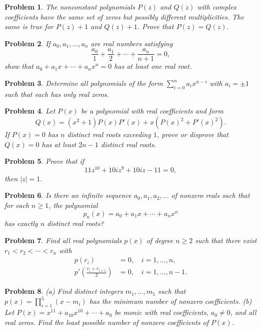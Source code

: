 \documentclass[12pt]{article}
\newtheorem{problem}{Problem}
\begin{document}
\begin{problem}
The nonconstant polynomials $P(z)$ and $Q(z)$ with complex coefficients have the same set of zeros but possibly different multiplicities. The same is true for $P(z)+1$ and $Q(z)+1$. Prove that $P(z)=Q(z)$.
\end{problem}

\begin{problem}
If $a_0, a_1, \dots, a_n$ are real numbers satisfying
\[
\frac{a_0}{1} + \frac{a_1}{2} + \cdots + \frac{a_n}{n+1} = 0,
\]
show that $a_0 + a_1x + \cdots + a_nx^n = 0$ has at least one real root.
\end{problem}

\begin{problem}
Determine all polynomials of the form $\sum_{i=0}^n a_ix^{n-i}$ with $a_i = \pm 1$ such that each has only real zeros.
\end{problem}

\begin{problem}
Let $P(x)$ be a polynomial with real coefficients and form
\[
Q(x) = (x^2+1)P(x)P'(x) + x(P(x)^2 + P'(x)^2).
\]
If $P(x)=0$ has $n$ distinct real roots exceeding $1$, prove or disprove that $Q(x)=0$ has at least $2n-1$ distinct real roots.
\end{problem}

\begin{problem}
Prove that if
\[
11z^{10} + 10iz^9 + 10iz - 11 = 0,
\]
then $|z|=1$.
\end{problem}

\begin{problem}
Is there an infinite sequence $a_0,a_1,a_2,\dots$ of nonzero reals such that for each $n\geq 1$, the polynomial
\[
p_n(x) = a_0 + a_1x + \cdots + a_nx^n
\]
has exactly $n$ distinct real roots?
\end{problem}

\begin{problem}
Find all real polynomials $p(x)$ of degree $n\geq 2$ such that there exist $r_1<r_2<\cdots<r_n$ with
\begin{align*}
p(r_i)&=0, \quad i=1,\dots,n,\\
p'\!\left(\tfrac{r_i+r_{i+1}}{2}\right)&=0,\quad i=1,\dots,n-1.
\end{align*}
\end{problem}

\begin{problem}
(a) Find distinct integers $m_1,\dots,m_5$ such that $p(x)=\prod_{i=1}^5(x-m_i)$ has the minimum number of nonzero coefficients.  
(b) Let $P(x)=x^{11}+a_{10}x^{10}+\cdots+a_0$ be monic with real coefficients, $a_0\neq0$, and all real zeros. Find the least possible number of nonzero coefficients of $P(x)$.
\end{problem}
\end{document}
